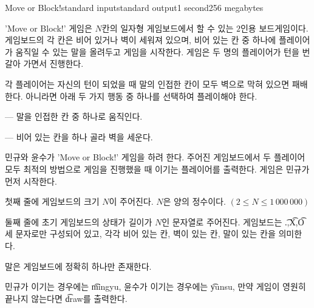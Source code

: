 \begin{problem}{Move or Block!}{standard input}{standard output}{1 second}{256 megabytes}

'Move or Block!' 게임은  $N$칸의 일자형 게임보드에서 할 수 있는 $2$인용 보드게임이다. 게임보드의 각 칸은 비어 있거나 벽이 세워져 있으며, 비어 있는 칸 중 하나에 플레이어가 움직일 수 있는 말을 올려두고 게임을 시작한다. 게임은 두 명의 플레이어가 턴을 번갈아 가면서 진행한다.

각 플레이어는 자신의 턴이 되었을 때 말의 인접한 칸이 모두 벽으로 막혀 있으면 패배한다. 아니라면 아래 두 가지 행동 중 하나를 선택하여 플레이해야 한다.

 --- 말을 인접한 칸 중 하나로 움직인다.

 --- 비어 있는 칸을 하나 골라 벽을 세운다.

민규와 윤수가 'Move or Block!' 게임을 하려 한다. 주어진 게임보드에서 두 플레이어 모두 최적의 방법으로 게임을 진행했을 때 이기는 플레이어를 출력한다. 게임은 민규가 먼저 시작한다.

\InputFile
첫째 줄에 게임보드의 크기 $N$이 주어진다. $N$은 양의 정수이다. $(2 \le N \le 1\,000\,000)$

둘째 줄에 초기 게임보드의 상태가 길이가 $N$인 문자열로 주어진다. 게임보드는 \t{.},\t{X},\t{O} 세 문자로만 구성되어 있고, 각각 비어 있는 칸, 벽이 있는 칸, 말이 있는 칸을 의미한다.

말은 게임보드에 정확히 하나만 존재한다.

\OutputFile
민규가 이기는 경우에는 \t{mingyu}, 윤수가 이기는 경우에는 \t{yunsu}, 만약 게임이 영원히 끝나지 않는다면 \t{draw}를 출력한다.

\Examples

\begin{example}
%
%
\end{example}

\end{problem}

